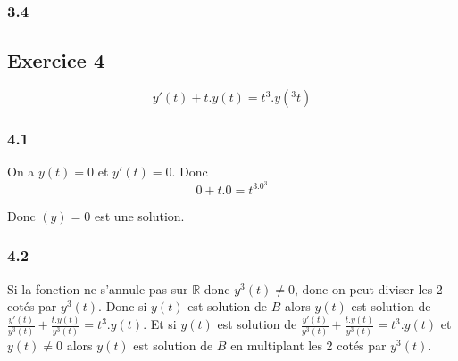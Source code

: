\documentclass[]{book}
\theoremstyle{definition}
\newcommand{\bb}[1]{\mathbb{#1}}
\newcommand{\R}{\bb{R}}
\begin{document}
\subsubsection*{3.4}


\subsection*{Exercice 4}
$$y'(t) + t.y(t) = t^3.y(^3t)$$
\subsubsection*{4.1}
On a $y(t) = 0$ et $y'(t) = 0$.
Donc
$$0 + t.0 = t^3.0^3$$

Donc $(y) = 0$ est une solution.

\subsubsection*{4.2}
Si la fonction ne s'annule pas sur $\R$ donc $y^3(t) \neq 0$, donc on peut diviser les 2 cot\'es par $y^3(t)$. Donc si $y(t)$ est solution de $B$ alors $y(t)$ est solution de $\frac{y'(t)}{y^3(t)} + \frac{t.y(t)}{y^3(t)} = t^3.y(t)$. Et si $y(t)$ est solution de $\frac{y'(t)}{y^3(t)} + \frac{t.y(t)}{y^3(t)} = t^3.y(t)$ et $y(t) \neq 0$ alors $y(t)$ est solution de $B$ en multiplant les 2 cot\'es par $y^3(t)$.
\end{document}
